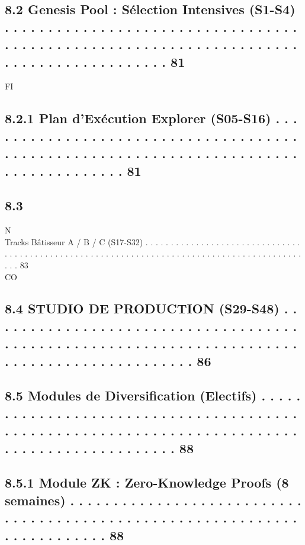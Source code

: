 \documentclass[12pt,landscape,a4paper]{article}
\begin{document}
\subsection{8.2     Genesis Pool : Sélection Intensives (S1-S4) . . . . . . . . . . . . . . . . . . . . . . . . . . . . . . . . . . . . . . . . . . . . . . . . . . . . . . . . . . . . . . . . . . . . . . . . . . . . . . . . . . . . . . . 81}
\vspace{0.5em}
\vspace{0.5em}
\vspace{0.5em}
\vspace{0.5em}
FI\\
\subsection{8.2.1              Plan d’Exécution Explorer (S05-S16) . . . . . . . . . . . . . . . . . . . . . . . . . . . . . . . . . . . . . . . . . . . . . . . . . . . . . . . . . . . . . . . . . . . . . . . . . . . . . . . . . . . . . 81}
\subsection{8.3}
N\\
Tracks Bâtisseur A / B / C (S17-S32) . . . . . . . . . . . . . . . . . . . . . . . . . . . . . . . . . . . . . . . . . . . . . . . . . . . . . . . . . . . . . . . . . . . . . . . . . . . . . . . . . . . . . . . . . . . . . 83\\
CO\\
\subsection{8.4     STUDIO DE PRODUCTION (S29-S48) . . . . . . . . . . . . . . . . . . . . . . . . . . . . . . . . . . . . . . . . . . . . . . . . . . . . . . . . . . . . . . . . . . . . . . . . . . . . . . . . . . . . . . . . . . . . 86}
\subsection{8.5     Modules de Diversification (Electifs) . . . . . . . . . . . . . . . . . . . . . . . . . . . . . . . . . . . . . . . . . . . . . . . . . . . . . . . . . . . . . . . . . . . . . . . . . . . . . . . . . . . . . . . . . . . . . 88}
\subsection{8.5.1              Module ZK : Zero-Knowledge Proofs (8 semaines) . . . . . . . . . . . . . . . . . . . . . . . . . . . . . . . . . . . . . . . . . . . . . . . . . . . . . . . . . . . . . . . . . . . . . . . . . 88}
\end{document}

